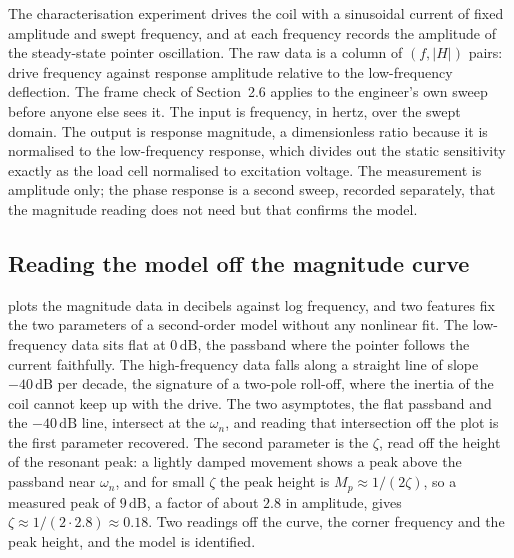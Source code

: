 The characterisation experiment drives the coil with a sinusoidal
current of fixed amplitude and swept frequency, and at each frequency
records the amplitude of the steady-state pointer oscillation. The raw
data is a column of $(f, |H|)$ pairs: drive frequency against
response amplitude relative to the low-frequency deflection. The frame
check of Section~2.6 applies to the engineer's own sweep before anyone
else sees it. The input is frequency, in hertz, over the swept domain.
The output is response magnitude, a dimensionless ratio because it is
normalised to the low-frequency response, which divides out the static
sensitivity exactly as the load cell normalised to excitation voltage.
The measurement is amplitude only; the phase response is a second
sweep, recorded separately, that the magnitude reading does not need
but that confirms the model.

\subsection{Reading the model off the magnitude curve}



 plots the magnitude data in
decibels against log frequency, and two features fix the two
parameters of a second-order model without any nonlinear fit. The
low-frequency data sits flat at $0\,\si{\deci\bel}$, the passband where
the pointer follows the current faithfully. The high-frequency data
falls along a straight line of slope $-40\,\si{\deci\bel}$ per decade,
the signature of a two-pole roll-off, where the inertia of the coil
cannot keep up with the drive. The two asymptotes, the flat passband
and the $-40\,\si{\deci\bel}$ line, intersect at the
 $\omega_{n}$, and reading that intersection
off the plot is the first parameter recovered. The second parameter is
the  $\zeta$, read off the height of the
resonant peak: a lightly damped movement shows a peak above the
passband near $\omega_{n}$, and for small $\zeta$ the peak height is
$M_{p} \approx 1/(2\zeta)$, so a measured peak of $9\,\si{\deci\bel}$,
a factor of about $2.8$ in amplitude, gives $\zeta \approx 1/(2 \cdot
2.8) \approx 0.18$. Two readings off the curve, the corner frequency
and the peak height, and the model is identified.

